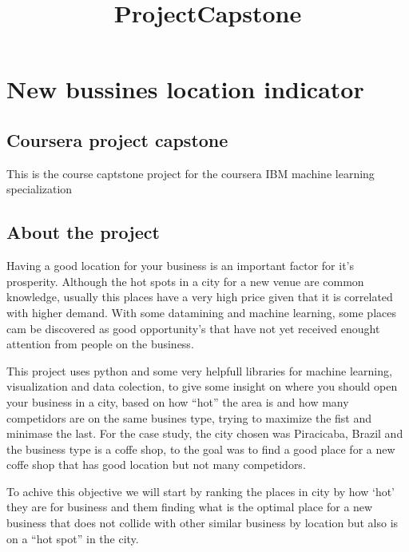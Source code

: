 \documentclass[11pt]{article}
\title{ProjectCapstone}
\begin{document}
    
    
    \maketitle
    
    

    
    \hypertarget{new-bussines-location-indicator}{%
\section{New bussines location
indicator}\label{new-bussines-location-indicator}}

\hypertarget{coursera-project-capstone}{%
\subsection{Coursera project capstone}\label{coursera-project-capstone}}

This is the course captstone project for the coursera IBM machine
learning specialization

\hypertarget{about-the-project}{%
\subsection{About the project}\label{about-the-project}}

Having a good location for your business is an important factor for it's
prosperity. Although the hot spots in a city for a new venue are common
knowledge, usually this places have a very high price given that it is
correlated with higher demand. With some datamining and machine
learning, some places cam be discovered as good opportunity's that have
not yet received enought attention from people on the business.

This project uses python and some very helpfull libraries for machine
learning, visualization and data colection, to give some insight on
where you should open your business in a city, based on how ``hot'' the
area is and how many competidors are on the same busines type, trying to
maximize the fist and minimase the last. For the case study, the city
chosen was Piracicaba, Brazil and the business type is a coffe shop, to
the goal was to find a good place for a new coffe shop that has good
location but not many competidors.

To achive this objective we will start by ranking the places in city by
how `hot' they are for business and them finding what is the optimal
place for a new business that does not collide with other similar
business by location but also is on a ``hot spot'' in the city.
\end{document}
